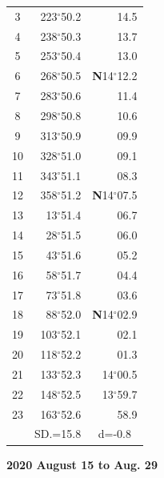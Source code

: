 \documentclass[10pt, a4paper]{report}
\begin{document}
\begin{scriptsize}
\begin{tabular*}{0.2\textwidth}[t]{@{\extracolsep{\fill}}|c|rr|}
3 & 223$^\circ$50.2 & \raisebox{0.24ex}{\boldmath$\cdot$~\boldmath$\cdot$~~}14.5\\
4 & 238$^\circ$50.3 & 13.7\\
5 & 253$^\circ$50.4 & 13.0\\[2Pt]
6 & 268$^\circ$50.5 & \textbf{N}14$^\circ$12.2\\
7 & 283$^\circ$50.6 & 11.4\\
8 & 298$^\circ$50.8 & 10.6\\
9 & 313$^\circ$50.9 & \raisebox{0.24ex}{\boldmath$\cdot$~\boldmath$\cdot$~~}09.9\\
10 & 328$^\circ$51.0 & 09.1\\
11 & 343$^\circ$51.1 & 08.3\\[2Pt]
12 & 358$^\circ$51.2 & \textbf{N}14$^\circ$07.5\\
13 & 13$^\circ$51.4 & 06.7\\
14 & 28$^\circ$51.5 & 06.0\\
15 & 43$^\circ$51.6 & \raisebox{0.24ex}{\boldmath$\cdot$~\boldmath$\cdot$~~}05.2\\
16 & 58$^\circ$51.7 & 04.4\\
17 & 73$^\circ$51.8 & 03.6\\[2Pt]
18 & 88$^\circ$52.0 & \textbf{N}14$^\circ$02.9\\
19 & 103$^\circ$52.1 & 02.1\\
20 & 118$^\circ$52.2 & 01.3\\
21 & 133$^\circ$52.3 & 14$^\circ$00.5\\
22 & 148$^\circ$52.5 & 13$^\circ$59.7\\
23 & 163$^\circ$52.6 & 58.9\\
\hline
\rule{0pt}{2.4ex} & \multicolumn{1}{c}{SD.=15.8} & \multicolumn{1}{c|}{d=-0.8}\\
\hline
\end{tabular*}

\end{scriptsize}
\newpage
\sffamily
\noindent
\begin{flushright}
\textbf{2020 August 15 to Aug. 29}\par
\end{flushright}
\end{document}

